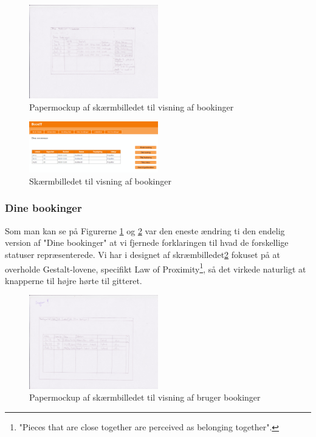 \begin{figure}[h!]
  \centering
    \includegraphics[width=0.5\textwidth]{Appendix/GUI-Prototype/PaperMockup/DineBookinger_001}
  \caption{Papermockup af skærmbilledet til visning af bookinger}
\label{Design_G_Development_YourBookings}
\end{figure} 

\begin{figure}[h!]
  \centering
    \includegraphics[width=0.5\textwidth]{Appendix/GUI-Prototype/DigitalMockup/DineBookinger}
  \caption{Skærmbilledet til visning af bookinger}
\label{Design_G_Development_YourBookings_Final}
\end{figure} 

\subsubsection{Dine bookinger}
Som man kan se på Figurerne \ref{Design_G_Development_YourBookings} og \ref{Design_G_Development_YourBookings_Final} var den eneste ændring ti den endelig version af "Dine bookinger" at vi fjernede forklaringen til hvad de forskellige statuser repræsenterede. Vi har i designet af skræmbilledet\ref{Design_G_Development_YourBookings_Final} fokuset på at overholde Gestalt-lovene\cite[s. 68]{SL_UID}, specifikt Law of Proximity\footnote{"Pieces that are close together are perceived as belonging together".}, så det virkede naturligt at knapperne til højre hørte til gitteret. 

\begin{figure}[h!]
  \centering
    \includegraphics[width=0.5\textwidth]{Appendix/GUI-Prototype/PaperMockup/GodkendBookinger_001}
  \caption{Papermockup af skærmbilledet til visning af bruger bookinger}
\label{Design_G_Development_ApproveBookings}
\end{figure} 

